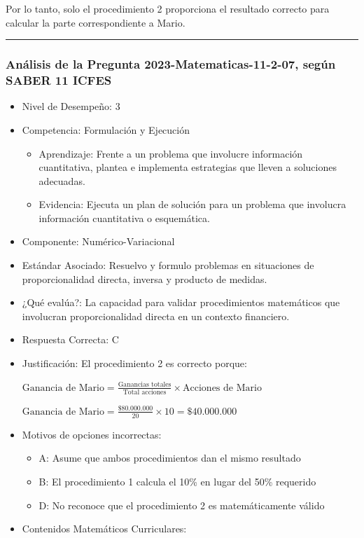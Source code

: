 \documentclass[
]{article}
\providecommand{\tightlist}{%
  \setlength{\itemsep}{0pt}\setlength{\parskip}{0pt}}
\begin{document}
Por lo tanto, solo el procedimiento 2 proporciona el resultado correcto
para calcular la parte correspondiente a Mario.

\begin{center}\rule{0.5\linewidth}{0.5pt}\end{center}

\subsubsection{Análisis de la Pregunta 2023-Matematicas-11-2-07, según
SABER 11
ICFES}\label{anuxe1lisis-de-la-pregunta-2023-matematicas-11-2-07-seguxfan-saber-11-icfes}

\begin{itemize}
\item
  Nivel de Desempeño: 3
\item
  Competencia: Formulación y Ejecución

  \begin{itemize}
  \tightlist
  \item
    Aprendizaje: Frente a un problema que involucre información
    cuantitativa, plantea e implementa estrategias que lleven a
    soluciones adecuadas.
  \item
    Evidencia: Ejecuta un plan de solución para un problema que
    involucra información cuantitativa o esquemática.
  \end{itemize}
\item
  Componente: Numérico-Variacional
\item
  Estándar Asociado: Resuelvo y formulo problemas en situaciones de
  proporcionalidad directa, inversa y producto de medidas.
\item
  ¿Qué evalúa?: La capacidad para validar procedimientos matemáticos que
  involucran proporcionalidad directa en un contexto financiero.
\item
  Respuesta Correcta: C
\item
  Justificación: El procedimiento 2 es correcto porque:

  \(\text{Ganancia de Mario} = \frac{\text{Ganancias totales}}{\text{Total acciones}} \times \text{Acciones de Mario}\)

  \(\text{Ganancia de Mario} = \frac{\$80.000.000}{20} \times 10 = \$40.000.000\)
\item
  Motivos de opciones incorrectas:

  \begin{itemize}
  \tightlist
  \item
    A: Asume que ambos procedimientos dan el mismo resultado
  \item
    B: El procedimiento 1 calcula el 10\% en lugar del 50\% requerido
  \item
    D: No reconoce que el procedimiento 2 es matemáticamente válido
  \end{itemize}
\item
  Contenidos Matemáticos Curriculares:


\end{itemize}
\end{document}

